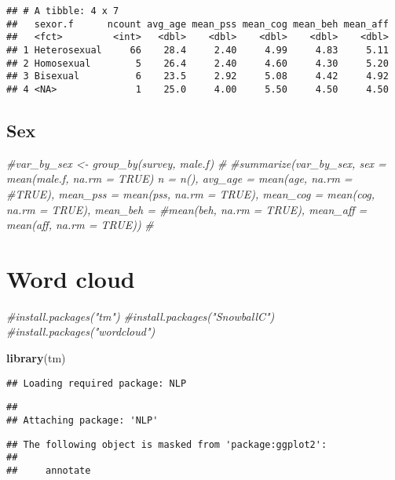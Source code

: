 \documentclass[]{article}
\newenvironment{Shaded}{\begin{snugshade}}{\end{snugshade}}
\newcommand{\KeywordTok}[1]{\textcolor[rgb]{0.13,0.29,0.53}{\textbf{#1}}}
\newcommand{\CommentTok}[1]{\textcolor[rgb]{0.56,0.35,0.01}{\textit{#1}}}
\newcommand{\NormalTok}[1]{#1}
\begin{document}
\begin{verbatim}
## # A tibble: 4 x 7
##   sexor.f      ncount avg_age mean_pss mean_cog mean_beh mean_aff
##   <fct>         <int>   <dbl>    <dbl>    <dbl>    <dbl>    <dbl>
## 1 Heterosexual     66    28.4     2.40     4.99     4.83     5.11
## 2 Homosexual        5    26.4     2.40     4.60     4.30     5.20
## 3 Bisexual          6    23.5     2.92     5.08     4.42     4.92
## 4 <NA>              1    25.0     4.00     5.50     4.50     4.50
\end{verbatim}

\subsection{Sex}\label{sex}

\begin{Shaded}
\begin{Highlighting}[]
\CommentTok{#var_by_sex <- group_by(survey, male.f)}
\CommentTok{#}
\CommentTok{#summarize(var_by_sex, sex = mean(male.f, na.rm = TRUE) n = n(), avg_age = mean(age, na.rm = #TRUE), mean_pss = mean(pss, na.rm = TRUE), mean_cog = mean(cog, na.rm = TRUE), mean_beh = #mean(beh, na.rm = TRUE), mean_aff = mean(aff, na.rm = TRUE))}
\CommentTok{#}
\end{Highlighting}
\end{Shaded}

\section{Word cloud}\label{word-cloud}

\begin{Shaded}
\begin{Highlighting}[]
\CommentTok{#install.packages("tm")}
\CommentTok{#install.packages("SnowballC")}
\CommentTok{#install.packages("wordcloud")}


\KeywordTok{library}\NormalTok{(tm)}
\end{Highlighting}
\end{Shaded}

\begin{verbatim}
## Loading required package: NLP
\end{verbatim}

\begin{verbatim}
## 
## Attaching package: 'NLP'
\end{verbatim}

\begin{verbatim}
## The following object is masked from 'package:ggplot2':
## 
##     annotate
\end{verbatim}
\end{document}
